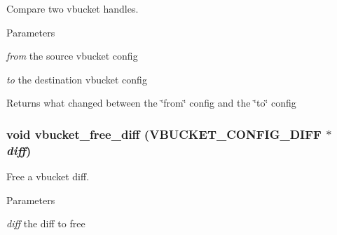 Compare two vbucket handles. 


\begin{DoxyParams}{Parameters}
\item[{\em from}]the source vbucket config \item[{\em to}]the destination vbucket config\end{DoxyParams}
\begin{DoxyReturn}{Returns}
what changed between the \char`\"{}from\char`\"{} config and the \char`\"{}to\char`\"{} config 
\end{DoxyReturn}
\hypertarget{group__cfgcmp_gaec47fa8f2f15b56adc86cfd63b64b4ed}{
\subsubsection[{vbucket\_\-free\_\-diff}]{\setlength{\rightskip}{0pt plus 5cm}void vbucket\_\-free\_\-diff ({\bf VBUCKET\_\-CONFIG\_\-DIFF} $\ast$ {\em diff})}}
\label{group__cfgcmp_gaec47fa8f2f15b56adc86cfd63b64b4ed}


Free a vbucket diff. 


\begin{DoxyParams}{Parameters}
\item[{\em diff}]the diff to free \end{DoxyParams}

